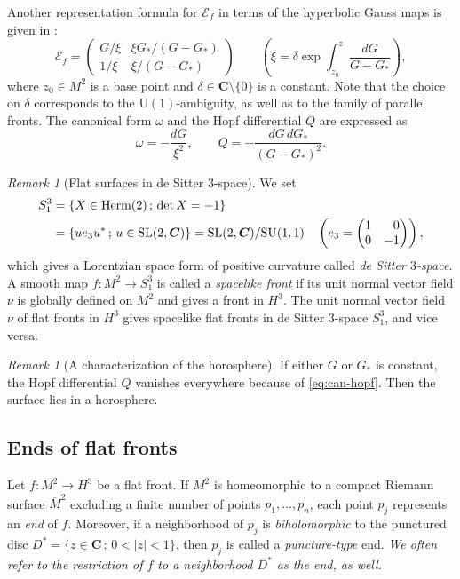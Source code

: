 \documentclass[a4paper]{amsart}
\theoremstyle{plain}
\theoremstyle{remark}
\newtheorem{remark}[theorem]{Remark}
\numberwithin{equation}{section}
\begin{document}
Another representation formula for ${\mathcal{E}}_f$ in terms of the hyperbolic
Gauss maps is given in \cite{KUY1}:
\begin{equation}\label{eq:gauss-repr}
   {\mathcal{E}}_f = \begin{pmatrix}
	     G/\xi & \xi G_*/(G-G_*) \\
	     1/\xi & \xi/(G-G_*)
	  \end{pmatrix}
	  \qquad
	  \left(
	     \xi = \delta\exp \int_{z_0}^z \frac{dG}{G-G_*}
	  \right),
\end{equation}
where $z_0 \in M^2$ is a base point and $\delta\in{\boldsymbol{C}}\setminus\{0\}$ is a 
constant. Note that the choice on $\delta$ corresponds to 
the $\mathrm{U}(1)$-ambiguity, as well as to the family of parallel fronts.
The canonical form $\omega$ and the Hopf differential $Q$ are expressed
as \begin{equation}\label{eq:can-hopf}
   \omega = -\frac{dG}{\xi^2}, \qquad
    Q = -\frac{dG\,dG_*}{(G-G_*)^2}.
\end{equation}
\begin{remark}[Flat surfaces in de Sitter 3-space]
 We set 
 \begin{align*}
  S^3_1 &= 
     \{X\in{\operatorname{Herm}}(2)\,;\,\det X=-1\} 
  \\
     &= \{ ue_3u^{*}\,;\,u\in{\operatorname{SL}}(2,{\boldsymbol{C}})\} = {\operatorname{SL}}(2,{\boldsymbol{C}})/{\operatorname{SU}}(1,1)
 \quad 
  \left(
       e_3=\begin{pmatrix} 1 & \hphantom{-}0 \\ 0 & -1 \end{pmatrix}
  \right),
 \end{align*}
 which gives a Lorentzian space form of positive curvature
 called {\it de Sitter $3$-space}.
 A smooth map $f\colon M^2\to S^3_1$ is called a {\it spacelike front\/} if
 its unit normal vector field $\nu$ is globally defined on
 $M^2$ and gives a front in $H^3$.
 The unit normal vector field $\nu$ of
 flat fronts in $H^3$ gives spacelike flat fronts in 
 de Sitter 3-space $S^3_1$, and vice versa.
\end{remark}
\begin{remark}[A characterization of the horosphere]\label{rmk:G_const}
If either $G$ or $G_*$ is constant,
the Hopf differential $Q$ vanishes everywhere because of
\eqref{eq:can-hopf}.
Then the surface lies in a horosphere.
\end{remark}

\subsection*{Ends of flat fronts}
Let $f\colon{}M^2\to H^3$ be a flat front.
If $M^2$ is homeomorphic to a compact Riemann surface
$\overline M^2$ excluding a finite number of points $p_1,\dots,p_n $,
each point $p_j$ represents an {\em end\/} of $f$.
Moreover, if a neighborhood of $p_j$ is {\em biholomorphic\/} to
the punctured disc 
$D^*=\{z\in{\boldsymbol{C}}\,;\,0<|z|<1\}$,
then $p_j$ is called a {\em puncture-type} end.
{\it We often refer to 
the restriction of $f$ to a neighborhood $D^*$ as the end, as well.}
\end{document}
